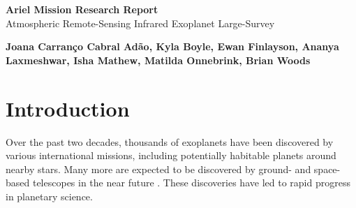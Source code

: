 \documentclass[12pt]{article}
\begin{document}
\begin{center}
    {\Large \textbf{Ariel Mission Research Report}}\\

    \vspace{.4cm}
    {\large Atmospheric Remote-Sensing Infrared Exoplanet Large-Survey}\\

    \vspace{1cm}
    \begin{minipage}{.8\textwidth}
        \centering
        \small
        \textbf{Joana Carranço Cabral Adão, Kyla Boyle, Ewan Finlayson, Ananya Laxmeshwar, Isha Mathew, Matilda Onnebrink, Brian Woods}
    \end{minipage}
    \vspace{2.3cm}

    \begin{abstract}

    Ariel, the Atmospheric Remote-sensing Infrared Exoplanet Large-survey, is a mission that forms part of ESA's Cosmic Vision program due to launch in 2029, and aimed at studying the chemical composition and thermal structures of exoplanet atmospheres.
    Using infrared spectroscopy, Ariel is set to observe thousands of exoplanets with focus on those hotter than 600 K in close orbits around their stars. By analysing their atmospheric makeup, including key chemical compositions,
    Ariel will help scientists better understand the diversity of exoplanet environments, providing crucial insights into planetary formation and evolution.
    Ariel will be the first mission dedicated to this task, paving the way for future missions that will expand our knowledge of exoplanets, including potentially habitable worlds.

    \end{abstract}

\end{center}

\newpage


\setcounter{page}{1}
\section{Introduction} \label{sec:1}

Over the past two decades, thousands of exoplanets have been discovered by various international missions, including potentially habitable planets around nearby stars.
Many more are expected to be discovered by ground- and space-based telescopes in the near future \cite{madhusudhan2019exoplanetary}.
These discoveries have led to rapid progress in planetary science.
\end{document}
